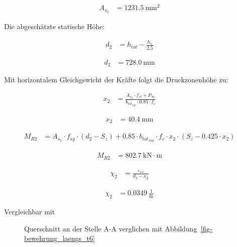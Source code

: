 \documentclass[
  11pt,
  letterpaper,
]{scrreprt}
\begin{document}
$$
\begin{aligned}
A_{s_{2}} &= 1231.5\ \mathrm{mm}^{2} \;
\end{aligned}
$$

Die abgeschätzte statische Höhe:

$$
\begin{aligned}
d_{2} &= h_{tot} - \frac{ h_{1} }{ 2.5 } \; 
\end{aligned}
$$

$$
\begin{aligned}
d_{2} &= 728.0\ \mathrm{mm} \;
\end{aligned}
$$

Mit horizontalem Gleichgewicht der Kräfte folgt die Druckzonenhöhe zu:

$$
\begin{aligned}
x_{2} &= \frac{ A_{s_{2}} \cdot f_{st} + P_{\infty} }{ b_{tot_{sup}} \cdot 0.85 \cdot f_{c} } \; 
\end{aligned}
$$

$$
\begin{aligned}
x_{2} &= 40.4\ \mathrm{mm} \;
\end{aligned}
$$

$$
\begin{aligned}
M_{R2} &= A_{s_{2}} \cdot f_{sy} \cdot \left( d_{2} - S_{z} \right) + 0.85 \cdot b_{tot_{sup}} \cdot f_{c} \cdot x_{2} \cdot \left( S_{z} - 0.425 \cdot x_{2} \right) \; 
\end{aligned}
$$

$$
\begin{aligned}
M_{R2} &= 802.7\ \mathrm{kN} \cdot \mathrm{m} \;
\end{aligned}
$$

$$
\begin{aligned}
\chi_{2} &= \frac{ \varepsilon_{sv} }{ d_{2} - x_{2} } \; 
\end{aligned}
$$

$$
\begin{aligned}
\chi_{2} &= 0.0349\ \frac{1}{\mathrm{m}} \;
\end{aligned}
$$

Vergleichbar mit

\begin{figure}[H]


\caption{\label{fig-qs_a_a}Querschnitt an der Stelle A-A verglichen mit
Abbildung~\ref{fig-bewehrung_laengs_t6}}

\end{figure}%
\end{document}
